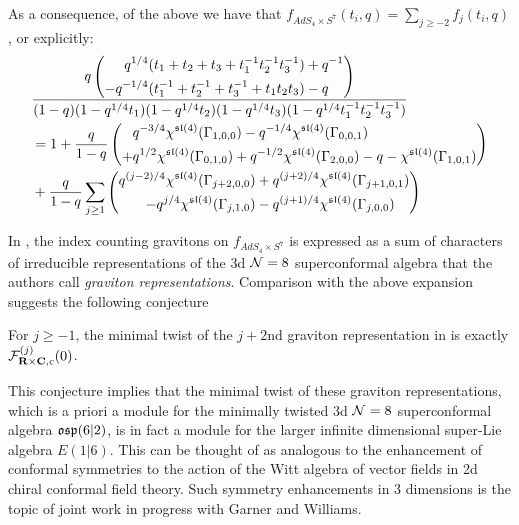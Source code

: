 \documentclass[../main.tex]{subfiles}
\begin{document}
\parsec[]
As a consequence, of the above we have that $f_{AdS_4\times S^7} (t_i, q) = \sum_{j\geq -2} f_j (t_i, q)$, or explicitly:
\begin{align*}
& \frac{q\left (\begin{aligned} q^{1/4}(t_1+ t_2 + t_3+t_1^{-1}t_2^{-1}t_3^{-1}) &+ q^{-1} \\- q^{-1/4}(t_1^{-1}+ t_2^{-1} + t_3^{-1}+t_1t_2t_3) &- q   \end{aligned}\right)}{(1-q)(1-q^{1/4}t_1)(1-q^{1/4}t_2)(1-q^{1/4}t_3)(1-q^{1/4}t_1^{-1}t_2^{-1}t_3^{-1})}  \\ 
& =  1 + \frac{q}{1-q} \left (\begin{aligned} & q^{-3/4}\chi^{\mathfrak{sl}(4)}(\Gamma_{1,0,0}) - q^{-1/4}\chi^{\mathfrak{sl}(4)}(\Gamma_{0,0,1}) \\+ & q^{1/2}\chi^{\mathfrak{sl}(4)}(\Gamma_{0,1,0})  + q^{-1/2}\chi^{\mathfrak{sl}(4)}(\Gamma_{2,0,0})  - q - \chi^{\mathfrak{sl}(4)}(\Gamma_{1,0,1}) \end{aligned}\right ) \\
& + \frac{q}{1-q} \sum_{j\geq 1} \left (\begin{aligned} q^{(j-2)/4}\chi^{\mathfrak{sl}(4)}(\Gamma_{j+2,0,0})  &+ q^{(j+2)/4}\chi^{\mathfrak{sl}(4)}(\Gamma_{j+1,0,1}) \\ - q^{j/4}\chi^{\mathfrak{sl}(4)}(\Gamma_{j,1,0}) & - q^{(j+1)/4}\chi^{\mathfrak{sl}(4)}(\Gamma_{j,0,0}) \end{aligned}\right ) 
\end{align*}

In \cite[Eq. (2.15, 2.16)]{Bhattacharya:2008zy}, the index counting gravitons on $f_{AdS_4\times S^7}$ is expressed as a sum of characters of irreducible representations of the 3d $\mathcal{N} = 8$ superconformal algebra that the authors call \textit{graviton representations}. Comparison with the above expansion suggests the following conjecture

\begin{conj}\label{conj:e16gravitonrep}
For $j\geq -1$, the minimal twist of the $j+2$nd graviton representation in \cite[Eq. (2.15, 2.16)]{Bhattacharya:2008zy} is exactly $\mathcal{F}^{(j)}_{\mathbf{R}\times \mathbf{C}, c}(0)$. 
\end{conj}

\begin{rmk}\label{rmk:e16enhance}
This conjecture implies that the minimal twist of these graviton representations, which is a priori a module for the minimally twisted 3d $\mathcal{N}=8$ superconformal algebra $\mathfrak{osp}(6|2)$, is in fact a module for the larger infinite dimensional super-Lie algebra $E(1|6)$. This can be thought of as analogous to the enhancement of conformal symmetries to the action of the Witt algebra of vector fields in 2d chiral conformal field theory. Such symmetry enhancements in 3 dimensions is the topic of joint work in progress with Garner and Williams.
\end{rmk}
\end{document}
